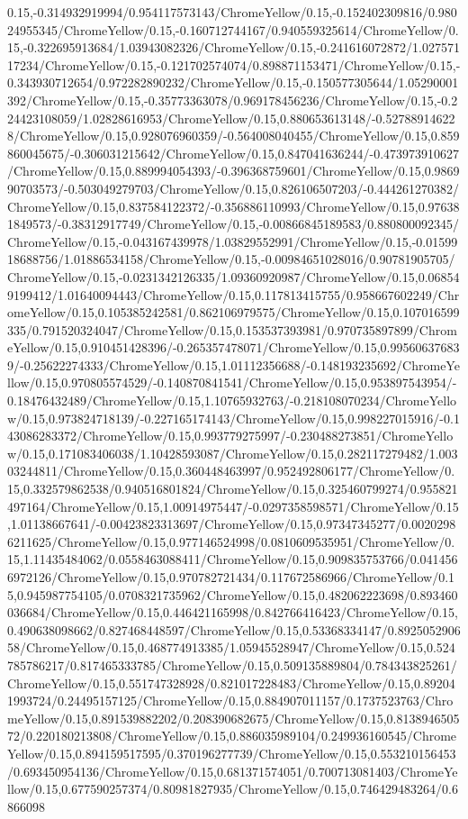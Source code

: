{\begin{tikzternal}
{0.15,-0.314932919994/0.954117573143/ChromeYellow/0.15,-0.152402309816/0.98024955345/ChromeYellow/0.15,-0.160712744167/0.940559325614/ChromeYellow/0.15,-0.322695913684/1.03943082326/ChromeYellow/0.15,-0.241616072872/1.02757117234/ChromeYellow/0.15,-0.121702574074/0.898871153471/ChromeYellow/0.15,-0.343930712654/0.972282890232/ChromeYellow/0.15,-0.150577305644/1.05290001392/ChromeYellow/0.15,-0.35773363078/0.969178456236/ChromeYellow/0.15,-0.224423108059/1.02828616953/ChromeYellow/0.15,0.880653613148/-0.527889146228/ChromeYellow/0.15,0.928076960359/-0.564008040455/ChromeYellow/0.15,0.859860045675/-0.306031215642/ChromeYellow/0.15,0.847041636244/-0.473973910627/ChromeYellow/0.15,0.889994054393/-0.396368759601/ChromeYellow/0.15,0.986990703573/-0.503049279703/ChromeYellow/0.15,0.826106507203/-0.444261270382/ChromeYellow/0.15,0.837584122372/-0.356886110993/ChromeYellow/0.15,0.976381849573/-0.38312917749/ChromeYellow/0.15,-0.00866845189583/0.880800092345/ChromeYellow/0.15,-0.043167439978/1.03829552991/ChromeYellow/0.15,-0.0159918688756/1.01886534158/ChromeYellow/0.15,-0.00984651028016/0.90781905705/ChromeYellow/0.15,-0.0231342126335/1.09360920987/ChromeYellow/0.15,0.068549199412/1.01640094443/ChromeYellow/0.15,0.117813415755/0.958667602249/ChromeYellow/0.15,0.105385242581/0.862106979575/ChromeYellow/0.15,0.107016599335/0.791520324047/ChromeYellow/0.15,0.153537393981/0.970735897899/ChromeYellow/0.15,0.910451428396/-0.265357478071/ChromeYellow/0.15,0.995606376839/-0.25622274333/ChromeYellow/0.15,1.01112356688/-0.148193235692/ChromeYellow/0.15,0.970805574529/-0.140870841541/ChromeYellow/0.15,0.953897543954/-0.18476432489/ChromeYellow/0.15,1.10765932763/-0.218108070234/ChromeYellow/0.15,0.973824718139/-0.227165174143/ChromeYellow/0.15,0.998227015916/-0.143086283372/ChromeYellow/0.15,0.993779275997/-0.230488273851/ChromeYellow/0.15,0.171083406038/1.10428593087/ChromeYellow/0.15,0.282117279482/1.00303244811/ChromeYellow/0.15,0.360448463997/0.952492806177/ChromeYellow/0.15,0.332579862538/0.940516801824/ChromeYellow/0.15,0.325460799274/0.955821497164/ChromeYellow/0.15,1.00914975447/-0.0297358598571/ChromeYellow/0.15,1.01138667641/-0.00423823313697/ChromeYellow/0.15,0.97347345277/0.00202986211625/ChromeYellow/0.15,0.977146524998/0.0810609535951/ChromeYellow/0.15,1.11435484062/0.0558463088411/ChromeYellow/0.15,0.909835753766/0.0414566972126/ChromeYellow/0.15,0.970782721434/0.117672586966/ChromeYellow/0.15,0.945987754105/0.0708321735962/ChromeYellow/0.15,0.482062223698/0.893460036684/ChromeYellow/0.15,0.446421165998/0.842766416423/ChromeYellow/0.15,0.490638098662/0.827468448597/ChromeYellow/0.15,0.53368334147/0.892505290658/ChromeYellow/0.15,0.468774913385/1.05945528947/ChromeYellow/0.15,0.524785786217/0.817465333785/ChromeYellow/0.15,0.509135889804/0.784343825261/ChromeYellow/0.15,0.551747328928/0.821017228483/ChromeYellow/0.15,0.892041993724/0.24495157125/ChromeYellow/0.15,0.884907011157/0.1737523763/ChromeYellow/0.15,0.891539882202/0.208390682675/ChromeYellow/0.15,0.813894650572/0.220180213808/ChromeYellow/0.15,0.886035989104/0.249936160545/ChromeYellow/0.15,0.894159517595/0.370196277739/ChromeYellow/0.15,0.553210156453/0.693450954136/ChromeYellow/0.15,0.681371574051/0.700713081403/ChromeYellow/0.15,0.677590257374/0.80981827935/ChromeYellow/0.15,0.746429483264/0.6866098}
\end{tikzternal}}
